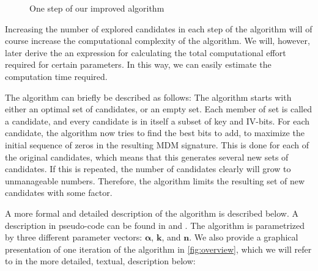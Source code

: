 {\begin{figure}[t]
\begin{center}
	\end{center}
	\caption{One step of our improved algorithm \cite{karlsson:2017}}
	\label{fig:overview}
\end{figure}

Increasing the number of explored candidates in each step of the algorithm will of course increase the computational complexity of the algorithm. We will, however, later derive the an expression for calculating the total computational effort required for certain parameters. In this way, we can easily estimate the computation time required.

The algorithm can briefly be described as follows:
The algorithm starts with either an optimal set of candidates, or an empty set. Each member of set is called a candidate, and every candidate is in itself a subset of key and IV-bits. For each candidate, the algorithm now tries to find the best bits to add, to maximize the initial sequence of zeros in the resulting MDM signature. This is done for each of the original candidates, which means that this generates several new sets of candidates. If this is repeated, the number of candidates clearly will grow to unmanageable numbers. Therefore, the algorithm limits the resulting set of new candidates with some factor.

A more formal and detailed description of the algorithm is described below. A description in pseudo-code can be found in  and . The algorithm is parametrized by three different parameter vectors: $\bm{\alpha}$, $\bm{k}$, and $\bm{n}$. We also provide a graphical presentation of one iteration of the algorithm in \autoref{fig:overview}, which we will refer to in the more detailed, textual, description below:

}
